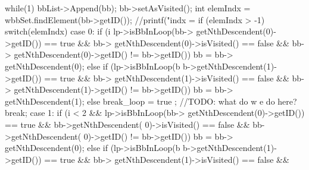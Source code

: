 \begin{DoxyCode}
{{{                        while(1) {
                                bbList->Append(bb);
                                bb->setAsVisited();
                                int elemIndx = wbbSet.findElement(bb->getID());
                                //printf("indx = %
                                if (elemIndx > -1) {
                                        switch(elemIndx) {
                                                case 0:
                                                        if (i%
                                                            lp->isBbInLoop(bb->
      getNthDescendent(0)->getID()) == true &&
                                                                bb->
      getNthDescendent(0)->isVisited() == false && 
                                                                bb->
      getNthDescendent(0)->getID() != bb->getID())
                                                                bb = bb->
      getNthDescendent(0);
                                                        else if (lp->isBbInLoop(b
      b->getNthDescendent(1)->getID()) == true && 
                                                                 bb->
      getNthDescendent(1)->isVisited() == false && 
                                                                         bb->
      getNthDescendent(1)->getID() != bb->getID())
                                                                bb = bb->
      getNthDescendent(1);
                                                        else
                                                                break_loop = true
      ;
                                                                //TODO: what do w
      e do here?
                                                        break;
                                                case 1: 
                                                        if (i < 2 && 
                                                            lp->isBbInLoop(bb->
      getNthDescendent(0)->getID()) == true && 
                                                            bb->getNthDescendent(
      0)->isVisited() == false && 
                                                            bb->getNthDescendent(
      0)->getID() != bb->getID())
                                                                bb = bb->
      getNthDescendent(0); 
                                                        else if (lp->isBbInLoop(b
      b->getNthDescendent(1)->getID()) == true && 
                                                                 bb->
      getNthDescendent(1)->isVisited() == false && 
}}}}}}
\end{DoxyCode}

